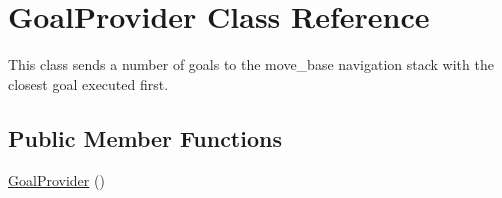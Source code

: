 \hypertarget{classGoalProvider}{\section{\-Goal\-Provider \-Class \-Reference}
\label{classGoalProvider}
}


\-This class sends a number of goals to the move\-\_\-base navigation stack with the closest goal executed first.  


\subsection*{\-Public \-Member \-Functions}
\begin{DoxyCompactItemize}
\item 
\hyperlink{classGoalProvider_a5f01df42b1cce4fd1ef3aee990ee2442}{\-Goal\-Provider} ()
\end{DoxyCompactItemize}
